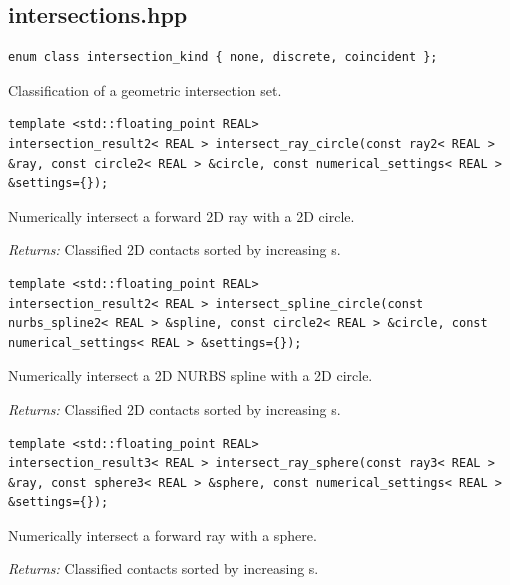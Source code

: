 \subsection{intersections.hpp}
\par\noindent\begin{minipage}{\linewidth}
\begin{lstlisting}[style=apireference]
enum class intersection_kind { none, discrete, coincident };
\end{lstlisting}
{\footnotesize Classification of a geometric intersection set.\par}
\end{minipage}\par\vspace{1pt}
\par\noindent\begin{minipage}{\linewidth}
\begin{lstlisting}[style=apireference]
template <std::floating_point REAL>
intersection_result2< REAL > intersect_ray_circle(const ray2< REAL > &ray, const circle2< REAL > &circle, const numerical_settings< REAL > &settings={});
\end{lstlisting}
{\footnotesize Numerically intersect a forward 2D ray with a 2D circle.\par}
{\footnotesize\textit{Returns:} Classified 2D contacts sorted by increasing s.\par}
\end{minipage}\par\vspace{1pt}
\par\noindent\begin{minipage}{\linewidth}
\begin{lstlisting}[style=apireference]
template <std::floating_point REAL>
intersection_result2< REAL > intersect_spline_circle(const nurbs_spline2< REAL > &spline, const circle2< REAL > &circle, const numerical_settings< REAL > &settings={});
\end{lstlisting}
{\footnotesize Numerically intersect a 2D NURBS spline with a 2D circle.\par}
{\footnotesize\textit{Returns:} Classified 2D contacts sorted by increasing s.\par}
\end{minipage}\par\vspace{1pt}
\par\noindent\begin{minipage}{\linewidth}
\begin{lstlisting}[style=apireference]
template <std::floating_point REAL>
intersection_result3< REAL > intersect_ray_sphere(const ray3< REAL > &ray, const sphere3< REAL > &sphere, const numerical_settings< REAL > &settings={});
\end{lstlisting}
{\footnotesize Numerically intersect a forward ray with a sphere.\par}
{\footnotesize\textit{Returns:} Classified contacts sorted by increasing s.\par}
\end{minipage}\par\vspace{1pt}
